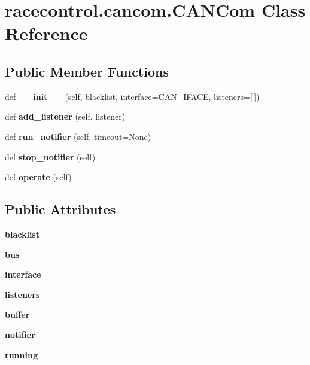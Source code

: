 \section{racecontrol.\+cancom.\+C\+A\+N\+Com Class Reference}
\label{classracecontrol_1_1cancom_1_1CANCom}
\subsection*{Public Member Functions}
\begin{DoxyCompactItemize}
\item 
def {\bfseries \+\_\+\+\_\+init\+\_\+\+\_\+} (self, blacklist, interface=C\+A\+N\+\_\+\+I\+F\+A\+CE, listeners=[$\,$])\label{classracecontrol_1_1cancom_1_1CANCom_ab985a1ec22be9cf57bccec3e400a1383}

\item 
def {\bf add\+\_\+listener} (self, listener)
\item 
def {\bf run\+\_\+notifier} (self, timeout=None)
\item 
def {\bf stop\+\_\+notifier} (self)
\item 
def {\bf operate} (self)
\end{DoxyCompactItemize}
\subsection*{Public Attributes}
\begin{DoxyCompactItemize}
\item 
{\bfseries blacklist}\label{classracecontrol_1_1cancom_1_1CANCom_a18b61f0fb38913869153e6d9d29722e5}

\item 
{\bfseries bus}\label{classracecontrol_1_1cancom_1_1CANCom_a0d02fccc3ae1db96edf0ab37a63642ea}

\item 
{\bfseries interface}\label{classracecontrol_1_1cancom_1_1CANCom_a57730a29aa159916aaba10d8bef3e2f4}

\item 
{\bfseries listeners}\label{classracecontrol_1_1cancom_1_1CANCom_ab5609d47b9144f9d53a71273d03deec6}

\item 
{\bfseries buffer}\label{classracecontrol_1_1cancom_1_1CANCom_ab2666668b9d321a5659448b044c8b607}

\item 
{\bfseries notifier}\label{classracecontrol_1_1cancom_1_1CANCom_a13c3f606fc3ee8bafd78b2694d3133c4}

\item 
{\bfseries running}\label{classracecontrol_1_1cancom_1_1CANCom_ad505d0df53d256b1d534952b07e10f63}

\end{DoxyCompactItemize}


